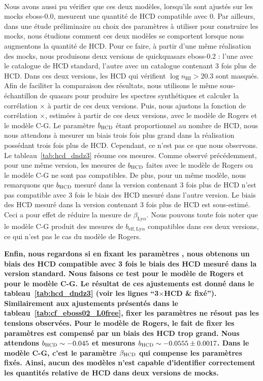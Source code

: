 \documentclass[11pt, twoside, a4paper, openright]{report}
\begin{document}
\paragraph{}
Nous avons aussi pu vérifier que ces deux modèles, lorsqu'ils sont ajustés sur les mocks eboss-0.0, mesurent une quantité de HCD compatible avec 0.
Par ailleurs, dans une étude préliminaire au choix des paramètres \lya{} à utiliser pour construire les mocks, nous étudions comment ces deux modèles se comportent lorsque nous augmentons la quantité de HCD.
Pour ce faire, à partir d'une même réalisation des mocks, nous produisons deux versions de quickquasars eboss-0.2 : l'une avec le catalogue de HCD standard, l'autre avec un catalogue contenant 3 fois plus de HCD. Dans ces deux versions, les HCD qui vérifient $\log n_{\mathrm{HI}} > \num{20.3}$ sont masqués. Afin de faciliter la comparaison des résultats, nous utilisons le même sous-échantillon de quasars pour produire les spectres synthétiques et calculer la corrélation \lya{}$\times$\lya{} à partir de ces deux versions.
Puis, nous ajustons la fonction de corrélation \lya{}$\times$\lya{}, estimées à partir de ces deux versions, avec le modèle de Rogers et le modèle C-G. Le paramètre $b_{\textsc{HCD}} $ étant proportionnel au nombre de HCD, nous nous attendons à mesurer un biais trois fois plus grand dans la réalisation possédant trois fois plus de HCD.
Cependant, ce n'est pas ce que nous observons. Le tableau~\ref{tab:hcd_dndz3} résume ces mesures.
Comme observé précédemment, pour une même version, les mesures de $b_{\textsc{HCD}}$ faites avec le modèle de Rogers ou le modèle C-G ne sont pas compatibles.
De plus, pour un même modèle, nous remarquons que $b_{\textsc{HCD}}$  mesuré dans la version contenant 3 fois plus de HCD n'est pas compatible avec 3 fois le biais des HCD mesuré dans l'autre version. Le biais des HCD mesuré dans la version contenant 3 fois plus de HCD est sous-estimé.
Ceci a pour effet de réduire la mesure de $\beta_{\mathrm{Ly}\alpha}$.
Nous pouvons toute fois noter que le modèle C-G produit des mesures de $b_{\mathrm{eff},\mathrm{Ly}\alpha}$ compatibles dans ces deux versions, ce qui n'est pas le cas du modèle de Rogers.

\textbf{Enfin, nous regardons si en fixant les paramètres \lya{}, nous obtenons un biais des HCD compatible avec 3 fois le biais des HCD mesuré dans la version standard. Nous faisons ce test pour le modèle de Rogers et pour le modèle C-G. Le résultat de ces ajustements est donné dans le tableau~\ref{tab:hcd_dndz3} (voir les lignes ``3$\times$HCD \& \lya{} fixé'').
Similairement aux ajustements présentés dans le tableau~\ref{tab:cf_eboss02_L0free}, fixer les paramètres \lya{} ne résout pas les tensions observées. 
Pour le modèle de Rogers, le fait de fixer les paramètres \lya{} est compensé par un biais des HCD trop grand. Nous attendons $b_{\textsc{HCD}} \sim -\num{0.045}$ et mesurons $b_{\textsc{HCD}} \sim -\num{0.0555} \pm \num{0.0017}$. Dans le modèle C-G, c'est le paramètre $\beta_{\textsc{HCD}}$ qui compense les paramètres \lya{} fixés.
Ainsi, aucun des modèles n'est capable d'identifier correctement les quantités relative de HCD dans deux versions de mocks.}
\end{document}
